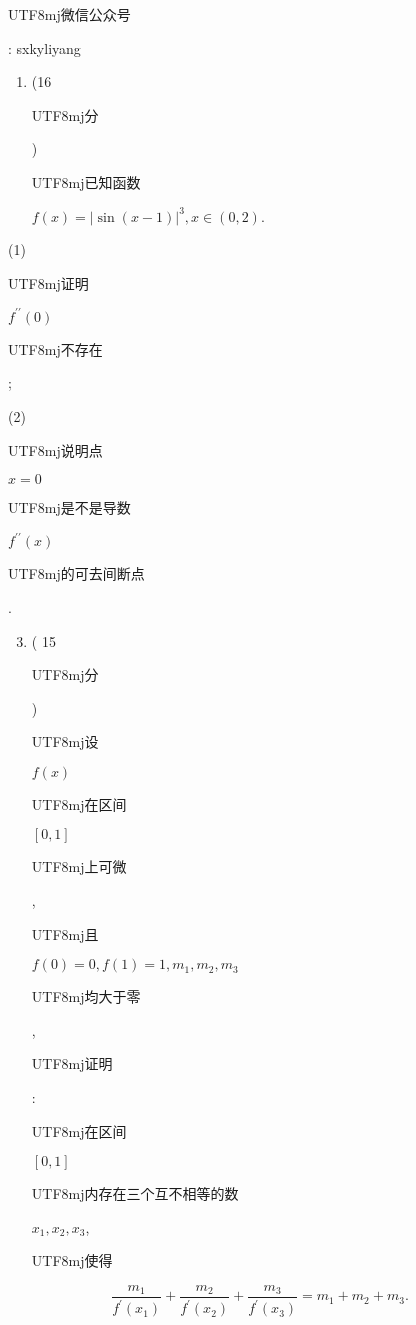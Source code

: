 \documentclass[10pt]{article}
\begin{document}
\begin{CJK}{UTF8}{mj}微信公众号\end{CJK}: sxkyliyang

\begin{enumerate}
  \item (16 \begin{CJK}{UTF8}{mj}分\end{CJK}) \begin{CJK}{UTF8}{mj}已知函数\end{CJK} $f(x)=|\sin (x-1)|^{3}, x \in(0,2)$.
\end{enumerate}
(1) \begin{CJK}{UTF8}{mj}证明\end{CJK} $f^{\prime \prime}(0)$ \begin{CJK}{UTF8}{mj}不存在\end{CJK};

(2) \begin{CJK}{UTF8}{mj}说明点\end{CJK} $x=0$ \begin{CJK}{UTF8}{mj}是不是导数\end{CJK} $f^{\prime \prime}(x)$ \begin{CJK}{UTF8}{mj}的可去间断点\end{CJK}.

\begin{enumerate}
  \setcounter{enumi}{2}
  \item ( 15 \begin{CJK}{UTF8}{mj}分\end{CJK})\begin{CJK}{UTF8}{mj}设\end{CJK} $f(x)$ \begin{CJK}{UTF8}{mj}在区间\end{CJK} $[0,1]$ \begin{CJK}{UTF8}{mj}上可微\end{CJK}, \begin{CJK}{UTF8}{mj}且\end{CJK} $f(0)=0, f(1)=1, m_{1}, m_{2}, m_{3}$ \begin{CJK}{UTF8}{mj}均大于零\end{CJK}, \begin{CJK}{UTF8}{mj}证明\end{CJK}: \begin{CJK}{UTF8}{mj}在区间\end{CJK} $[0,1]$ \begin{CJK}{UTF8}{mj}内存在三个互不相等的数\end{CJK} $x_{1}, x_{2}, x_{3}$, \begin{CJK}{UTF8}{mj}使得\end{CJK}
\end{enumerate}
$$
\frac{m_{1}}{f^{\prime}\left(x_{1}\right)}+\frac{m_{2}}{f^{\prime}\left(x_{2}\right)}+\frac{m_{3}}{f^{\prime}\left(x_{3}\right)}=m_{1}+m_{2}+m_{3} .
$$
\end{document}
